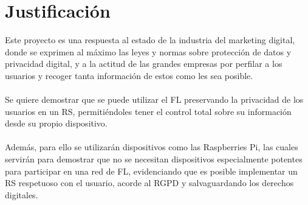 \section{Justificación}
Este proyecto es una respuesta al estado de la industria del marketing digital, donde se exprimen al máximo las leyes y normas sobre protección de datos y privacidad digital, y a la actitud de las grandes empresas por perfilar a los usuarios y recoger tanta información de estos como les sea posible.
\\\\
Se quiere demostrar que se puede utilizar el FL preservando la privacidad de los usuarios en un RS, permitiéndoles tener el control total sobre su información desde su propio dispositivo. 
\\ \\
Además, para ello se utilizarán dispositivos como las Raspberries Pi, las cuales servirán para demostrar que no se necesitan dispositivos especialmente potentes para participar en una red de FL, evidenciando que es posible implementar un RS respetuoso con el usuario, acorde al RGPD y salvaguardando los derechos digitales.
